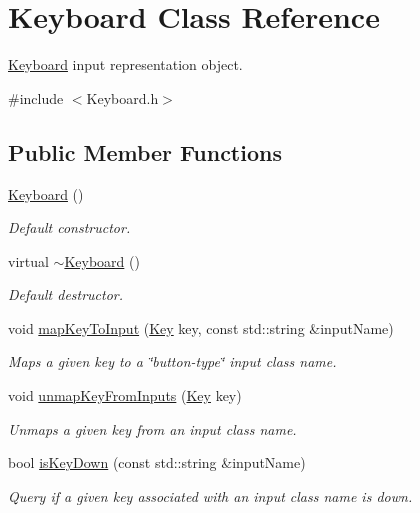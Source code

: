 \hypertarget{class_keyboard}{}\section{Keyboard Class Reference}
\label{class_keyboard}


\hyperlink{class_keyboard}{Keyboard} input representation object.  




{\ttfamily \#include $<$Keyboard.\+h$>$}

\subsection*{Public Member Functions}
\begin{DoxyCompactItemize}
\item 
\hyperlink{class_keyboard_ad6b0bb849d6bb7cdf63091e40b5f5f7f}{Keyboard} ()
\begin{DoxyCompactList}\small\item\em Default constructor. \end{DoxyCompactList}\item 
virtual \hyperlink{class_keyboard_af6a99ec66c8c722a45b967bf79167038}{$\sim$\+Keyboard} ()
\begin{DoxyCompactList}\small\item\em Default destructor. \end{DoxyCompactList}\item 
void \hyperlink{class_keyboard_a008bc2abfc7b8bf734ac414fbec0e335}{map\+Key\+To\+Input} (\hyperlink{_key_8h_ab3c7af4820830f9166ede9e5623c4e73}{Key} key, const std\+::string \&input\+Name)
\begin{DoxyCompactList}\small\item\em Maps a given key to a \char`\"{}button-\/type\char`\"{} input class name. \end{DoxyCompactList}\item 
void \hyperlink{class_keyboard_a33e9d448a774b273025da1254daeb3d4}{unmap\+Key\+From\+Inputs} (\hyperlink{_key_8h_ab3c7af4820830f9166ede9e5623c4e73}{Key} key)
\begin{DoxyCompactList}\small\item\em Unmaps a given key from an input class name. \end{DoxyCompactList}\item 
bool \hyperlink{class_keyboard_a07fef2266fd02345cafaef4d1e3eae78}{is\+Key\+Down} (const std\+::string \&input\+Name)
\begin{DoxyCompactList}\small\item\em Query if a given key associated with an input class name is down. \end{DoxyCompactList}\item 

\end{DoxyCompactItemize}
